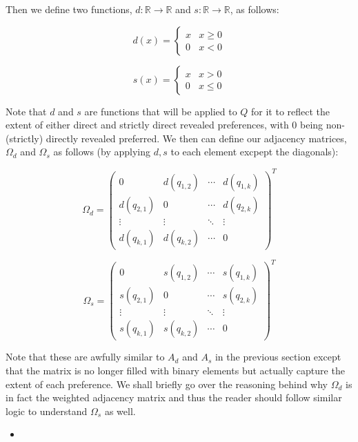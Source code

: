 \documentclass{article} %
\begin{document}
Then we define two functions, $d:\mathbb{R}\to\mathbb{R}$ and $s:\mathbb{R}\to\mathbb{R}$, as follows:

\begin{minipage}{.5\linewidth}
\[ 
d(x)=
 \begin{cases} 
   x & x\geq0 \\
    0 & x<0
 \end{cases}
\]
\end{minipage}
\begin{minipage}{.5\linewidth}
\[
s(x)=
    \begin{cases} 
      x & x>0 \\
      0 & x\leq0
   \end{cases}
\]
\end{minipage}

Note that $d$ and $s$ are functions that will be applied to $Q$ for it to reflect the extent of either direct and strictly direct revealed preferences, with 0 being non-(strictly) directly revealed preferred. We then can define our adjacency matrices, $\Omega_d$ and $\Omega_s$ as follows (by applying $d,s$ to each element excpept the diagonals):

\[
\Omega_d =
	\begin{pmatrix}
	0 & d(q_{1,2}) & \cdots & d(q_{1,k}) \\
    d(q_{2,1}) & 0 & \cdots & d(q_{2,k}) \\
    \vdots & \vdots & \ddots & \vdots \\
    d(q_{k,1}) & d(q_{k,2}) & \cdots & 0
	\end{pmatrix}^T
\]

\[
\Omega_s =
	\begin{pmatrix}
	0 & s(q_{1,2}) & \cdots & s(q_{1,k}) \\
    s(q_{2,1}) & 0 & \cdots & s(q_{2,k}) \\
    \vdots & \vdots & \ddots & \vdots \\
    s(q_{k,1}) & s(q_{k,2}) & \cdots & 0
	\end{pmatrix} ^T
\]

Note that these are awfully similar to $A_d$ and $A_s$ in the previous section except that the matrix is no longer filled with binary elements but actually capture the extent of each preference. We shall briefly go over the reasoning behind why $\Omega_d$ is in fact the weighted adjacency matrix and thus the reader should follow similar logic to understand $\Omega_s$ as well.

\begin{itemize}
	\item
\end{itemize}



\end{document}
